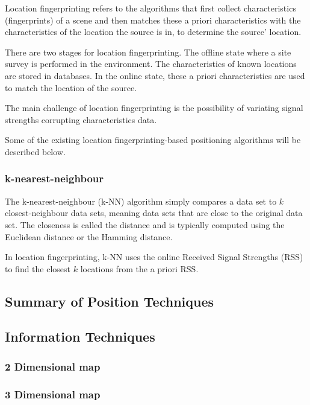   Location fingerprinting refers to the algorithms that first collect characteristics (fingerprints) of a scene and then matches these a priori characteristics with the characteristics of the location the source is in, to determine the source' location.

  There are two stages for location fingerprinting. The offline state where a site survey is performed in the environment. The characteristics of known locations are stored in databases. In the online state, these a priori characteristics are used to match the location of the source.

  The main challenge of location fingerprinting is the possibility of variating signal strengths corrupting characteristics data.

  Some of the existing location fingerprinting-based positioning algorithms will be described below.

  \subsubsection{k-nearest-neighbour}

  The k-nearest-neighbour (k-NN) algorithm simply compares a data set to $k$ closest-neighbour data sets, meaning data sets that are close to the original data set. The closeness is called the distance and is typically computed using the Euclidean distance or the Hamming distance.\cite{Liu2007, wiki_knn}

  In location fingerprinting, k-NN uses the online Received Signal Strengths (RSS) to find the closest $k$ locations from the a priori RSS.


  \subsection{Summary of Position Techniques}

  \subsection{Information Techniques}

  \subsubsection{2 Dimensional map}

  \subsubsection{3 Dimensional map}

